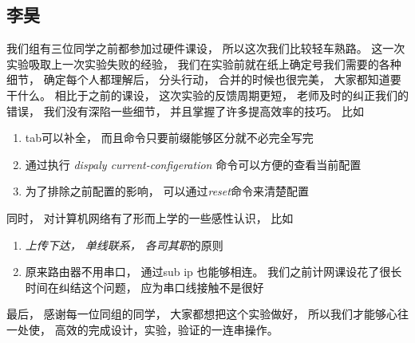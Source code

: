 \subsection{李昊}
	我们组有三位同学之前都参加过硬件课设， 所以这次我们比较轻车熟路。
	这一次实验吸取上一次实验失败的经验， 我们在实验前就在纸上确定号我们需要的各种细节， 确定每个人都理解后， 分头行动， 合并的时候也很完美， 大家都知道要干什么。
	相比于之前的课设， 这次实验的反馈周期更短， 老师及时的纠正我们的错误， 我们没有深陷一些细节， 并且掌握了许多提高效率的技巧。
	比如
	\begin{enumerate}
	  \item tab可以补全， 而且命令只要前缀能够区分就不必完全写完
	  \item  通过执行 \emph{dispaly current-configeration} 命令可以方便的查看当前配置
	  \item 为了排除之前配置的影响， 可以通过\emph{reset}命令来清楚配置
	\end{enumerate}
	同时， 对计算机网络有了形而上学的一些感性认识， 比如
	\begin{enumerate}
	  \item \emph{上传下达， 单线联系， 各司其职}的原则
	  \item  原来路由器不用串口， 通过sub ip 也能够相连。 我们之前计网课设花了很长时间在纠结这个问题， 应为串口线接触不是很好
	\end{enumerate}
	最后， 感谢每一位同组的同学， 大家都想把这个实验做好， 所以我们才能够心往一处使， 高效的完成设计，实验，验证的一连串操作。

